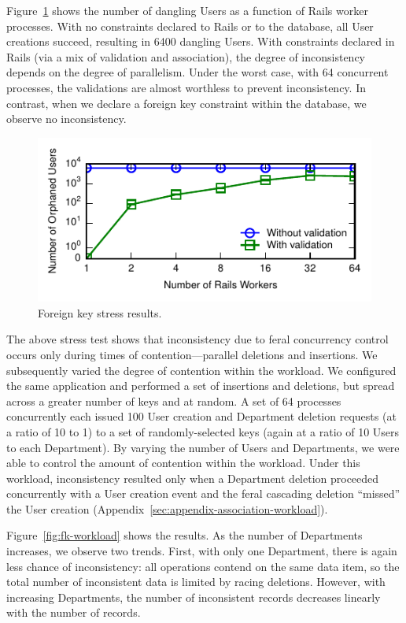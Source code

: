 Figure~\ref{fig:fk-stress} shows the number of dangling Users as a
function of Rails worker processes. With no constraints declared to
Rails or to the database, all User creations succeed, resulting in
6400 dangling Users. With constraints declared in Rails (via a mix of
validation and association), the degree of inconsistency depends on
the degree of parallelism. Under the worst case, with 64 concurrent
processes, the validations are almost worthless to prevent
inconsistency. In contrast, when we declare a foreign key constraint
within the database, we observe no inconsistency.

\begin{figure}
\includegraphics[width=\columnwidth]{figs/fk-stress-violations.pdf}\vspace{-1em}
\caption{Foreign key stress results.}
\label{fig:fk-stress}
\end{figure}

The above stress test shows that inconsistency due to feral
concurrency control occurs only during times of contention---parallel
deletions and insertions. We subsequently varied the degree of
contention within the workload. We configured the same application and
performed a set of insertions and deletions, but spread across a
greater number of keys and at random. A set of 64 processes
concurrently each issued 100 User creation and Department deletion
requests (at a ratio of 10 to 1) to a set of randomly-selected keys
(again at a ratio of 10 Users to each Department). By varying the
number of Users and Departments, we were able to control the amount of
contention within the workload. Under this workload, inconsistency
resulted only when a Department deletion proceeded concurrently with a
User creation event and the feral cascading deletion ``missed'' the
User creation (Appendix~\ref{sec:appendix-association-workload}).

Figure~\ref{fig:fk-workload} shows the results. As the number of
Departments increases, we observe two trends. First, with only one
Department, there is again less chance of inconsistency: all
operations contend on the same data item, so the total number of
inconsistent data is limited by racing deletions. However, with
increasing Departments, the number of inconsistent records decreases
linearly with the number of records.

